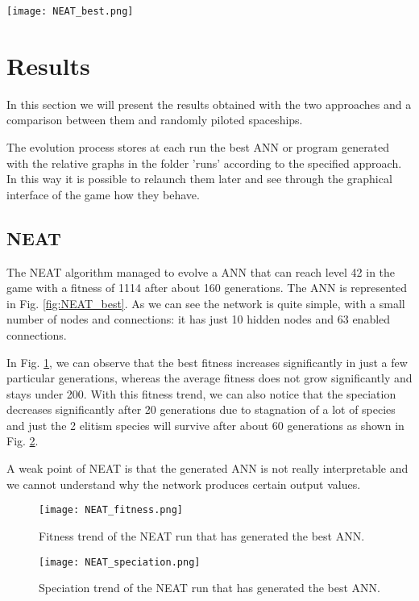 
\begin{figure*}[htbp]
\centerline{\texttt{[image: NEAT\_best.png]}}
\caption{Best ANN generated by NEAT.}
\label{fig:NEAT_best}
\end{figure*}


\section{Results}
In this section we will present the results obtained with the two approaches and a
comparison between them and randomly piloted spaceships.

The evolution process stores at each run the best ANN or program generated with the
relative graphs in the folder 'runs' according to the specified approach. In this way it is
possible to relaunch them later and see through the graphical interface of the game how
they behave.

\subsection{NEAT}
The NEAT algorithm managed to evolve a ANN that can reach level 42 in the game with a
fitness of 1114 after about 160 generations. The ANN is represented in Fig. \ref{fig:NEAT_best}. As we can
see the network is quite simple, with a small number of nodes and connections: it has just 10
hidden nodes and 63 enabled connections.

In Fig. \ref{fig:NEAT_fitness}, we can observe that the best fitness increases significantly in just a few particular
generations, whereas the average fitness does not grow significantly and stays under 200.
With this fitness trend, we can also notice that the speciation decreases significantly after 20
generations due to stagnation of a lot of species and just the 2 elitism species will survive
after about 60 generations as shown in Fig. \ref{fig:NEAT_speciation}.

A weak point of NEAT is that the generated ANN is not really interpretable and we cannot
understand why the network produces certain output values.


\begin{figure}[htbp]
\centerline{\texttt{[image: NEAT\_fitness.png]}}
\caption{Fitness trend of the NEAT run that has generated the best ANN.}
\label{fig:NEAT_fitness}
\end{figure}


\begin{figure}[htbp]
\centerline{\texttt{[image: NEAT\_speciation.png]}}
\caption{Speciation trend of the NEAT run that has generated the best ANN.}
\label{fig:NEAT_speciation}
\end{figure}


